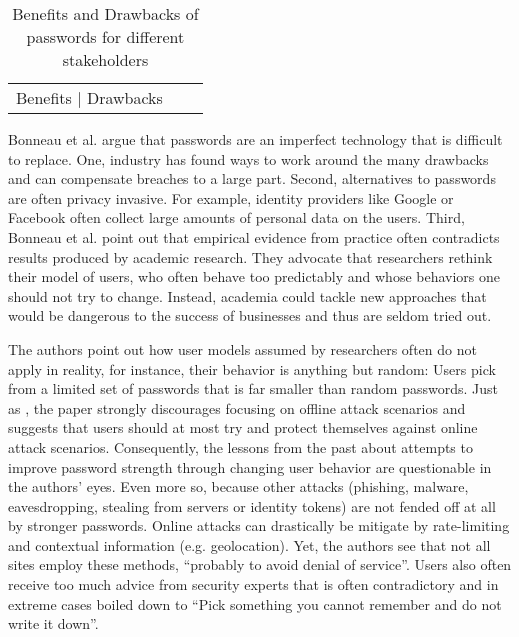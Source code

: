 \begin{table}
	\begin{tabular}{|l|l|l|}
		Benefits | Drawbacks 
	\end{tabular}
	\caption{\label{table:rw:benefits_drawbacks_pws}Benefits and Drawbacks of passwords for different stakeholders}
\end{table}




Bonneau et al. argue \cite{Bonneau2015ImperfectAuthentication} that passwords are an imperfect technology that is difficult to replace. One, industry has found ways to work around the many drawbacks and can compensate breaches to a large part. Second, alternatives to passwords are often privacy invasive. For example, identity providers like Google or Facebook often collect large amounts of personal data on the users. Third, Bonneau et al. point out that empirical evidence from practice often contradicts results produced by academic research. They advocate that researchers rethink their model of users, who often behave too predictably and whose behaviors one should not try to change. Instead, academia could tackle new approaches that would be dangerous to the success of businesses and thus are seldom tried out. 

The authors point out how user models assumed by researchers often do not apply in reality, for instance, their behavior is anything but random: Users pick from a limited set of passwords that is far smaller than random passwords. Just as \cite{Florencio2014PasswordPortfoliosFiniteUser}, the paper strongly discourages focusing on offline attack scenarios and suggests that users should at most try and protect themselves against online attack scenarios. Consequently, the lessons from the past about attempts to improve password strength through changing user behavior are questionable in the authors' eyes. Even more so, because other attacks (phishing, malware, eavesdropping, stealing from servers or identity tokens) are not fended off at all by stronger passwords. Online attacks can drastically be mitigate by rate-limiting and contextual information (e.g. geolocation). Yet, the authors see that not all sites employ these methods, ``probably to avoid denial of service''. Users also often receive too much advice from security experts that is often contradictory and in extreme cases boiled down to ``Pick something you cannot remember and do not write it down''. 

